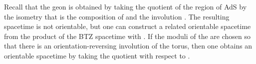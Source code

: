 \documentclass[a4paper,12pt]{article}
\begin{document}
Recall \cite{louko:geon} that the \coordHE{} geon is
obtained by taking the quotient of the region \coordHE{} of AdS\coordHE{}
by the isometry that is the composition of \coordHE{} and
the involution \coordHE{}.  The resulting spacetime is not orientable, but one can
construct a related orientable spacetime from the product of the BTZ
spacetime with \coordHE{}.  If the moduli of the \coordHE{} are chosen so that
there is an orientation-reversing involution \coordHE{} of the torus, then
one obtains an orientable spacetime by taking the quotient with
respect to \coordHE{}.
\end{document}
